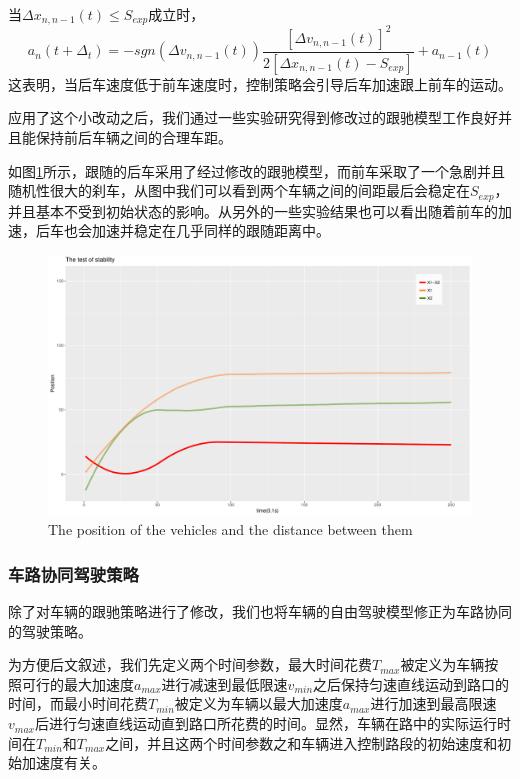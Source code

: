 \documentclass[a4paper,UTF8]{paper}
\begin{document}
当$\Delta x_{n,n-1}(t)\le S_{exp}$成立时， 
$$a_n(t+\Delta_t)=-sgn(\Delta v_{n,n-1}(t))\frac{[\Delta v_{n,n-1}(t)]^2}{2[\Delta x_{n,n-1}(t)-S_{exp}]}+a_{n-1}(t)$$
这表明，当后车速度低于前车速度时，控制策略会引导后车加速跟上前车的运动。

应用了这个小改动之后，我们通过一些实验研究得到修改过的跟驰模型工作良好并且能保持前后车辆之间的合理车距。

如图\ref{carf}所示，跟随的后车采用了经过修改的跟驰模型，而前车采取了一个急剧并且随机性很大的刹车，从图中我们可以看到两个车辆之间的间距最后会稳定在$S_{exp}$，并且基本不受到初始状态的影响。从另外的一些实验结果也可以看出随着前车的加速，后车也会加速并稳定在几乎同样的跟随距离中。

\begin{figure}
\centering
\includegraphics[width=\textwidth]{NearlyGoDie_2.pdf}
\caption{The position of the vehicles and the distance between them}
\label{carf}
\end{figure}

\subsubsection{车路协同驾驶策略}
\label{section:tgs}

除了对车辆的跟驰策略进行了修改，我们也将车辆的自由驾驶模型修正为车路协同的驾驶策略。

为方便后文叙述，我们先定义两个时间参数，最大时间花费$T_{max}$被定义为车辆按照可行的最大加速度$a_{max}$进行减速到最低限速$v_{min}$之后保持匀速直线运动到路口的时间，而最小时间花费$T_{min}$被定义为车辆以最大加速度$a_{max}$进行加速到最高限速$v_{max}$后进行匀速直线运动直到路口所花费的时间。显然，车辆在路中的实际运行时间在$T_{min}$和$T_{max}$之间，并且这两个时间参数之和车辆进入控制路段的初始速度和初始加速度有关。
\end{document}
